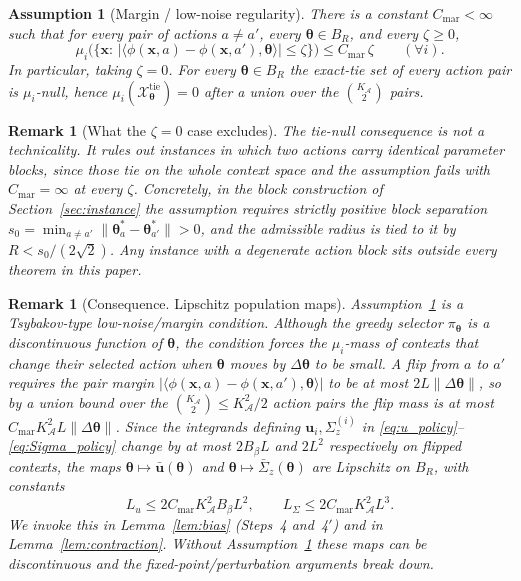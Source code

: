 \documentclass[11pt]{article}
\newtheorem{assumption}[theorem]{Assumption}
\newtheorem{remark}[theorem]{Remark}
\begin{document}
\begin{assumption}[Margin / low-noise regularity]\label{ass:margin}
There is a constant $C_{\mathrm{mar}}<\infty$ such that for every pair
of actions $a\neq a'$, every $\bm{\theta}\in B_R$, and every $\zeta\geq 0$,
\[
\mu_i\bigl(\{\bm{x}:\,
|\langle\phi(\bm{x},a)-\phi(\bm{x},a'),\bm{\theta}\rangle|\leq\zeta\}\bigr)
\leq C_{\mathrm{mar}}\,\zeta
\qquad(\forall i).
\]
In particular, taking $\zeta=0$. For every $\bm{\theta}\in B_R$ the
exact-tie set of every action pair is $\mu_i$-null, hence
$\mu_i(\mathcal{X}^{\mathrm{tie}}_{\bm{\theta}})=0$ after a union over
the $\binom{K_{\mathcal{A}}}{2}$ pairs.
\end{assumption}

\begin{remark}[What the $\zeta=0$ case excludes]\label{rem:tie_null}
The tie-null consequence is not a technicality. It rules out
instances in which two actions carry identical parameter blocks, since
those tie on the whole context space and the assumption fails with
$C_{\mathrm{mar}}=\infty$ at every $\zeta$.  Concretely, in the block
construction of Section~\ref{sec:instance} the assumption requires
strictly positive block separation
$s_0=\min_{a\neq a'}\|\bm\theta^{\!*}_a-\bm\theta^{\!*}_{a'}\|>0$, and
the admissible radius is tied to it by $R<s_0/(2\sqrt2)$.  Any
instance with a degenerate action block sits outside every theorem in
this paper.
\end{remark}

\begin{remark}[Consequence. Lipschitz population maps]\label{rem:lip}
Assumption~\ref{ass:margin} is a Tsybakov-type low-noise/margin
condition.  Although the greedy selector $\pi_{\bm{\theta}}$ is a
\emph{discontinuous} function of $\bm{\theta}$, the condition forces
the $\mu_i$-mass of contexts that \emph{change} their selected action
when $\bm{\theta}$ moves by $\Delta\bm{\theta}$ to be small. A flip
from $a$ to $a'$ requires the pair margin
$|\langle\phi(\bm{x},a)-\phi(\bm{x},a'),\bm{\theta}\rangle|$ to be at
most $2L\|\Delta\bm{\theta}\|$, so by a union bound over the
$\binom{K_{\mathcal{A}}}{2}\leq K_{\mathcal{A}}^2/2$ action pairs the
flip mass is at most
$C_{\mathrm{mar}}K_{\mathcal{A}}^2 L\|\Delta\bm{\theta}\|$.
Since the integrands defining $\bm{u}_i,\Sigma_z^{(i)}$ in
\eqref{eq:u_policy}--\eqref{eq:Sigma_policy} change by at most
$2B_\beta L$ and $2L^2$ respectively on flipped contexts, the maps
$\bm{\theta}\mapsto\bar{\bm{u}}(\bm{\theta})$ and
$\bm{\theta}\mapsto\bar{\Sigma}_z(\bm{\theta})$ are Lipschitz on $B_R$,
with constants
\[
L_u\leq 2C_{\mathrm{mar}}K_{\mathcal{A}}^2 B_\beta L^2,\qquad
L_\Sigma\leq 2C_{\mathrm{mar}}K_{\mathcal{A}}^2 L^3.
\]
We invoke this in Lemma~\ref{lem:bias} (Steps~4 and~4$'$) and in
Lemma~\ref{lem:contraction}.  Without
Assumption~\ref{ass:margin} these maps can be discontinuous and the
fixed-point/perturbation arguments break down.
\end{remark}
\end{document}
